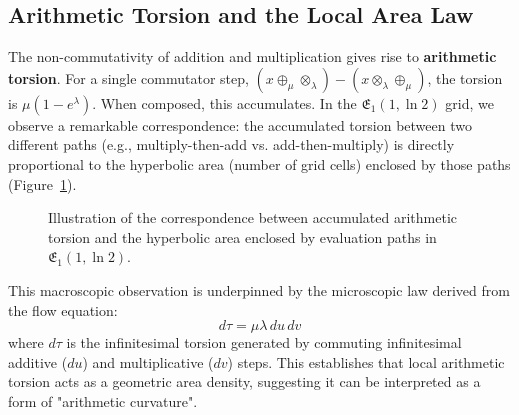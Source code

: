 \documentclass[12pt]{article}
\begin{document}
\subsection{Arithmetic Torsion and the Local Area Law}

The non-commutativity of addition and multiplication gives rise to \textbf{arithmetic torsion}. For a single commutator step, \( (x \oplus_\mu \otimes_\lambda) - (x \otimes_\lambda \oplus_\mu) \), the torsion is \( \mu(1 - e^\lambda) \). When composed, this accumulates. In the \( \mathfrak{E}_1(1, \ln 2) \) grid, we observe a remarkable correspondence: the accumulated torsion between two different paths (e.g., multiply-then-add vs. add-then-multiply) is directly proportional to the hyperbolic area (number of grid cells) enclosed by those paths (Figure~\ref{fig:area-formula_cs}).

\begin{figure}[ht]
    \centering
    \caption{Illustration of the correspondence between accumulated arithmetic torsion and the hyperbolic area enclosed by evaluation paths in \( \mathfrak{E}_1(1, \ln 2) \).}
    \label{fig:area-formula_cs}
\end{figure}

This macroscopic observation is underpinned by the microscopic law derived from the flow equation:
\begin{equation}
    d\tau = \mu \lambda\, du\, dv \label{eq:area_formula_diff_cs}
\end{equation}
where \( d\tau \) is the infinitesimal torsion generated by commuting infinitesimal additive (\(du\)) and multiplicative (\(dv\)) steps. This establishes that local arithmetic torsion acts as a geometric area density, suggesting it can be interpreted as a form of "arithmetic curvature".
\end{document}
